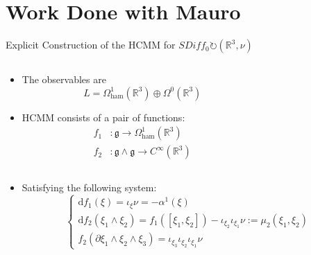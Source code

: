 \documentclass[beamer,10pt]{standalone}
\begin{document}
\section{Work Done with Mauro}

  \begin{frame}{Explicit Construction of the HCMM for $SDiff_0 \circlearrowright (\mathbb{R}^3,\nu)$}\label{frame:explicithcmm}
	\begin{columns}
		\begin{column}[c]{.5\linewidth}
		  	\begin{itemize}
		  		\item The observables are  $$L= \Omega^1_{\textrm{ham}}(\mathbb{R}^3)\oplus\Omega^0(\mathbb{R}^3)$$
		  		\item HCMM consists of a pair of functions:
					\begin{align*}
						f_1 &\colon \mathfrak{g} \rightarrow \Omega^1_{\textrm{ham}}(\mathbb{R}^3) \\
						f_2 &\colon \mathfrak{g}\wedge\mathfrak{g} \rightarrow C^\infty(\mathbb{R}^3)
					\end{align*}	
		  	\end{itemize}
		\end{column}	
	  	\hfill  	
		\begin{column}[c]{.5\linewidth}
  		
 	 	\end{column}
 	 \end{columns}
 	\begin{columns}
		\begin{column}[c]{.8\linewidth}
		 	 \begin{itemize}
				\item Satisfying the following system:
					\begin{displaymath}
						\begin{cases}
							\textrm{d} f_1(\xi) = \iota_\xi \nu = -\alpha^1(\xi) \\
							\textrm{d} f_2(\xi_1 \wedge \xi_2) = f_1\left([\xi_1,\xi_2]\right) - \iota_{\xi_2}\iota_{\xi_1} \nu 
							 := \mu_2(\xi_1,\xi_2)\\
							f_2\left(\partial \xi_1 \wedge \xi_2 \wedge \xi_3 \right) = \iota_{\xi_3}\iota_{\xi_2}\iota_{\xi_1} \nu

\end{cases}
\end{displaymath}
\end{itemize}
\end{column}
\end{columns}
\end{frame}
\end{document}
